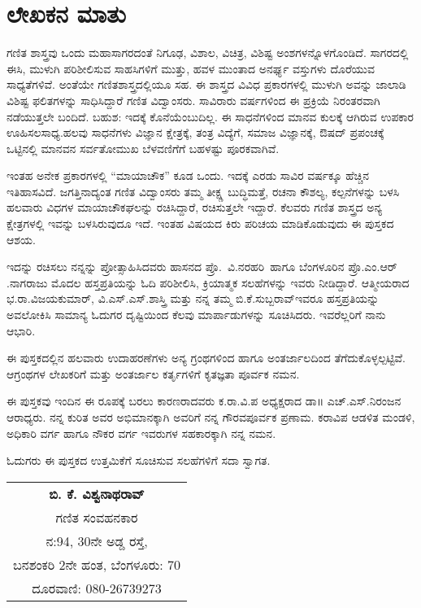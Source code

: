 \chapter*{ಲೇಖಕನ ಮಾತು}

\phantom{a}

\vskip  -1.2cm

\quad 
ಗಣಿತ ಶಾಸ್ತ್ರವು ಒಂದು ಮಹಾಸಾಗರದಂತೆ ನಿಗೂಢ, ವಿಶಾಲ, ವಿಚಿತ್ರ, ವಿಶಿಷ್ಟ ಅಂಶಗಳನ್ನೊಳಗೊಂಡಿದೆ. ಸಾಗರದಲ್ಲಿ ಈಸಿ, ಮುಳುಗಿ ಪರಿಶೀಲಿಸುವ ಸಾಹಸಿಗಳಿಗೆ ಮುತ್ತು, ಹವಳ ಮುಂತಾದ ಅನರ್ಘ್ಯ ವಸ್ತುಗಳು ದೊರೆಯುವ ಸಾಧ್ಯತೆಗಳಿವೆ. ಅಂತೆಯೇ ಗಣಿತಶಾಸ್ತ್ರದಲ್ಲಿಯೂ ಸಹ. ಈ ಶಾಸ್ತ್ರದ ವಿವಿಧ ಪ್ರಕಾರಗಳಲ್ಲಿ ಮುಳುಗಿ ಅವನ್ನು ಜಾಲಾಡಿ ವಿಶಿಷ್ಟ ಫಲಿತ\-ಗಳನ್ನು ಸಾಧಿಸಿದ್ದಾರೆ ಗಣಿತ ವಿದ್ವಾಂಸರು. ಸಾವಿರಾರು ವರ್ಷಗಳಿಂದ ಈ ಪ್ರಕ್ರಿಯೆ ನಿರಂತರ\-ವಾಗಿ ನಡೆಯುತ್ತಲೇ ಬಂದಿದೆ. ಬಹುಶ: ಇದಕ್ಕೆ ಕೊನೆಯೆಂಬುದಿಲ್ಲ. ಈ ಸಾಧನೆಗಳಿಂದ ಮಾನವ ಕುಲಕ್ಕೆ ಆಗಿರುವ ಉಪಕಾರ ಊಹಿಸಲಸಾಧ್ಯ.ಹಲವು ಸಾಧನೆಗಳು ವಿಜ್ಞಾನ ಕ್ಷೇತ್ರಕ್ಕೆ, ತಂತ್ರ ವಿದ್ಯೆಗೆ, ಸಮಾಜ ವಿಜ್ಞಾನಕ್ಕೆ, ಔಷದ್ ಪ್ರಪಂಚಕ್ಕೆ ಒಟ್ಟಿನಲ್ಲಿ ಮಾನವನ ಸರ್ವತೋಮುಖ \linebreak ಬೆಳವಣಿಗೆಗೆ ಬಹಳಷ್ಟು ಪೂರಕವಾಗಿವೆ.

ಇಂತಹ ಅನೇಕ ಪ್ರಕಾರಗಳಲ್ಲಿ “ಮಾಯಾಚೌಕ” ಕೂಡ ಒಂದು. ಇದಕ್ಕೆ ಎರಡು ಸಾವಿರ ವರ್ಷಕ್ಕೂ ಹೆಚ್ಚಿನ ಇತಿಹಾಸವಿದೆ. ಜಗತ್ತಿನಾದ್ಯಂತ ಗಣಿತ ವಿದ್ವಾಂಸರು ತಮ್ಮ ತೀಕ್ಷ್ಣ ಬುದ್ಧಿ\-ಮತ್ತೆ, ರಚನಾ ಕೌಶಲ್ಯ, ಕಲ್ಪನೆಗಳನ್ನು ಬಳಸಿ ಹಲವಾರು ವಿಧಗಳ ಮಾಯಾಚೌಕ\-ಘಲನ್ನು ರಚಿಸಿ\-ದ್ದಾರೆ, ರಚಿಸುತ್ತಲೇ ಇದ್ದಾರೆ. ಕೆಲವರು ಗಣಿತ ಶಾಸ್ತ್ರದ ಅನ್ಯ ಕ್ಷೇತ್ರಗಳಲ್ಲಿ ಇವನ್ನು ಬಳಸಿರುವುದೂ ಇದೆ. ಇಂತಹ ವಿಷಯದ ಕಿರು ಪರಿಚಯ ಮಾಡಿಕೊಡುವುದು ಈ ಪುಸ್ತಕದ ಆಶಯ.

ಇದನ್ನು ರಚಿಸಲು ನನ್ನನ್ನು ಪ್ರೋತ್ಸಾಹಿಸಿದವರು  ಹಾಸನದ \hbox{ಪ್ರೊ. ವಿ.ನರಹರಿ ಹಾಗೂ} ಬೆಂಗಳೂರಿನ ಪ್ರೊ.ಎಂ.ಆರ್​.ನಾಗರಾಜು ಮೊದಲ ಹಸ್ತಪ್ರತಿಯನ್ನು ಓದಿ ಪರಿಶೀಲಿಸಿ, \linebreak ಕ್ರಿಯಾತ್ಮಕ ಸಲಹೆಗಳನ್ನು ಇವರು ನೀಡಿದ್ದಾರೆ. ಆತ್ಮೀಯರಾದ ಭ.ರಾ.ವಿಜಯಕುಮಾರ್​, ವಿ.ಎಸ್​.ಎಸ್​.ಶಾಸ್ತ್ರಿ ಮತ್ತು ನನ್ನ ತಮ್ಮ ಬಿ.ಕೆ.ಸುಬ್ಬರಾವ್​ ಇವರೂ ಹಸ್ತಪ್ರತಿಯನ್ನು \linebreak ಅವಲೋಕಿಸಿ ಸಾಮಾನ್ಯ ಓದುಗರ ದೃಷ್ಟಿಯಿಂದ ಕೆಲವು ಮಾರ್ಪಾಡುಗಳನ್ನು ಸೂಚಿಸಿದರು. \linebreak ಇವರೆಲ್ಲರಿಗೆ ನಾನು ಆಭಾರಿ.
\eject

ಈ ಪುಸ್ತಕದಲ್ಲಿನ ಹಲವಾರು ಉದಾಹರಣೆಗಳು ಅನ್ಯ ಗ್ರಂಥಗಳಿಂದ ಹಾಗೂ \linebreak ಅಂತರ್ಜಾಲದಿಂದ ತೆಗೆದುಕೊಳ್ಳಲ್ಪಟ್ಟಿವೆ. ಆಗ್ರಂಥಗಳ ಲೇಖಕರಿಗೆ ಮತ್ತು ಅಂತರ್ಜಾಲ \linebreak ಕರ್ತೃಗಳಿಗೆ ಕೃತಜ್ಞತಾ ಪೂರ್ವಕ ನಮನ.

ಈ ಪುಸ್ತಕವು ಇಂದಿನ ಈ ರೂಪಕ್ಕೆ ಬರಲು ಕಾರಣರಾದವರು ಕ.ರಾ.ವಿ.ಪ ಅಧ್ಯಕ್ಷರಾದ ಡಾ॥ ಎಚ್​.ಎಸ್​.ನಿರಂಜನ ಆರಾಧ್ಯರು. ನನ್ನ ಕುರಿತ ಅವರ ಅಭಿಮಾನಕ್ಕಾಗಿ ಅವರಿಗೆ ನನ್ನ ಗೌರವಪೂರ್ವಕ ಪ್ರಣಾಮ. ಕರಾವಿಪ ಆಡಳಿತ ಮಂಡಳಿ, ಅಧಿಕಾರಿ ವರ್ಗ ಹಾಗೂ ನೌಕರ ವರ್ಗ ಇವರುಗಳ ಸಹಕಾರಕ್ಕಾಗಿ ನನ್ನ ನಮನ.

ಓದುಗರು ಈ ಪುಸ್ತಕದ ಉತ್ತಮಿಕೆಗೆ ಸೂಚಿಸುವ ಸಲಹೆಗಳಿಗೆ ಸದಾ ಸ್ವಾಗತ.

\begin{flushright}
\begin{tabular}{c}
{\bf ಬಿ. ಕೆ. ವಿಶ್ವನಾಥರಾವ್}\\
ಗಣಿತ ಸಂವಹನಕಾರ\\
ನ:{\rm 94}, {\rm 30}ನೇ ಅಡ್ಡ ರಸ್ತೆ, \\
ಬನಶಂಕರಿ {\rm 2}ನೇ ಹಂತ, ಬೆಂಗಳೂರು: {\rm 70}\\
ದೂರವಾಣಿ: {\rm 080-26739273}
\end{tabular}
\end{flushright}
